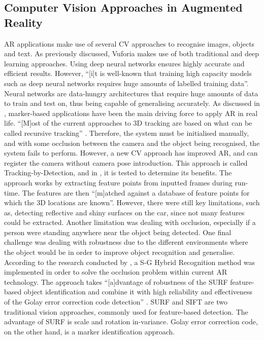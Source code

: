 \documentclass{aifyp}
\begin{document}
\subsection{Computer Vision Approaches in Augmented Reality}
\indent AR applications make use of several CV approaches to recognise images, objects and text. As previously discussed, Vuforia makes use of both traditional and deep learning approaches. Using deep neural networks ensures highly accurate and efficient results. However, “[i]t is well-known that training high capacity models such as deep neural networks requires huge amounts of labelled training data”\cite{ARMeetsCompVision}. Neural networks are data-hungry architectures that require huge amounts of data to train and test on, thus being capable of generalising accurately.
\newline
\newline
\indent As discussed in \cite{OnComputerVisionForAR}, marker-based applications have been the main driving force to apply AR in real life. “[M]ost of the current approaches to 3D tracking are based on what can be called recursive tracking” \cite{OnComputerVisionForAR}. Therefore, the system must be initialised manually, and with some occlusion between the camera and the object being recognised, the system fails to perform. However, a new CV approach has improved AR, and can register the camera without camera pose introduction. This approach is called Tracking-by-Detection, and in \cite{OnComputerVisionForAR}, it is tested to determine its benefits. The approach works by extracting feature points from inputted frames during run-time. The features are then “[m]atched against a database of feature points for which the 3D locations are known”\cite{OnComputerVisionForAR}. However, there were still key limitations, such as, detecting reflective and shiny surfaces on the car, since not many features could be extracted. Another limitation was dealing with occlusion, especially if a person were standing anywhere near the object being detected. One final challenge was dealing with robustness due to the different environments where the object would be in order to improve object recognition and generalise. 
\newline
\newline
\indent According to the research conducted by \cite{HybridSURFAR}, a S-G Hybrid Recognition method was implemented in order to solve the occlusion problem within current AR technology. The approach takes “[a]dvantage of robustness of the SURF feature-based object identification and combine it with high reliability and effectiveness of the Golay error correction code detection” \cite{HybridSURFAR}. SURF and SIFT are two traditional vision approaches, commonly used for feature-based detection. The advantage of SURF is scale and rotation in-variance. Golay error correction code, on the other hand, is a marker identification approach.
\end{document}
